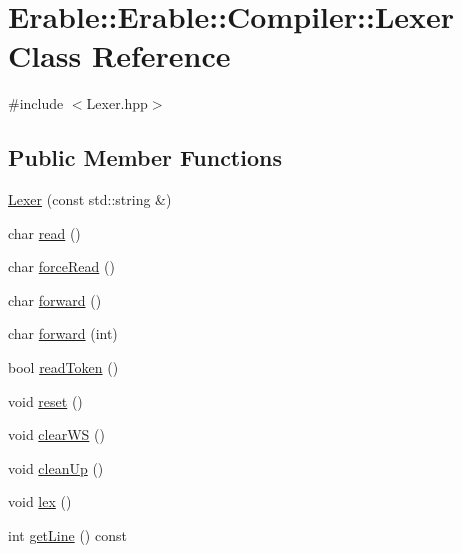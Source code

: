 \hypertarget{class_erable_1_1_erable_1_1_compiler_1_1_lexer}{}\section{Erable\+::Erable\+::Compiler\+::Lexer Class Reference}
\label{class_erable_1_1_erable_1_1_compiler_1_1_lexer}


{\ttfamily \#include $<$Lexer.\+hpp$>$}

\subsection*{Public Member Functions}
\begin{DoxyCompactItemize}
\item 
\mbox{\hyperlink{class_erable_1_1_erable_1_1_compiler_1_1_lexer_a141128e9089058be9318db1f44af71ad}{Lexer}} (const std\+::string \&)
\item 
char \mbox{\hyperlink{class_erable_1_1_erable_1_1_compiler_1_1_lexer_a5b8a54f73d0ace4fd9b8829111eea63f}{read}} ()
\item 
char \mbox{\hyperlink{class_erable_1_1_erable_1_1_compiler_1_1_lexer_a2053804b4f42e08d4ad914d7960dbd52}{force\+Read}} ()
\item 
char \mbox{\hyperlink{class_erable_1_1_erable_1_1_compiler_1_1_lexer_a94d27ba0036c6f70d19ec43f002f84a9}{forward}} ()
\item 
char \mbox{\hyperlink{class_erable_1_1_erable_1_1_compiler_1_1_lexer_a997a6dcc8ed04ffe9e752f062e39c547}{forward}} (int)
\item 
bool \mbox{\hyperlink{class_erable_1_1_erable_1_1_compiler_1_1_lexer_af8ec384b3b7b39971d2c4ffc3493fa80}{read\+Token}} ()
\item 
void \mbox{\hyperlink{class_erable_1_1_erable_1_1_compiler_1_1_lexer_a7cd677de562c09e51eed558b86e79ca0}{reset}} ()
\item 
void \mbox{\hyperlink{class_erable_1_1_erable_1_1_compiler_1_1_lexer_acbc35c6228eb3256c1b93340feb6a874}{clear\+WS}} ()
\item 
void \mbox{\hyperlink{class_erable_1_1_erable_1_1_compiler_1_1_lexer_a79dbbd23201b4875d2d5495e9c6fe501}{clean\+Up}} ()
\item 
void \mbox{\hyperlink{class_erable_1_1_erable_1_1_compiler_1_1_lexer_a0be9063fbe928d441a6338d4c16d9842}{lex}} ()
\item 
int \mbox{\hyperlink{class_erable_1_1_erable_1_1_compiler_1_1_lexer_a8986a071c753421ec4bfcabda355b882}{get\+Line}} () const

\end{DoxyCompactItemize}

